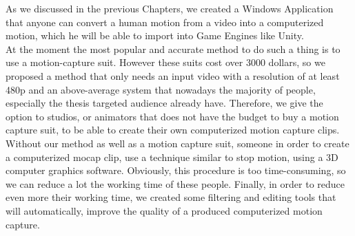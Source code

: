 As we discussed in the previous Chapters, we created a Windows Application that anyone can convert a human motion from a video into a computerized motion, which he will be able to import into Game Engines like Unity.\\ 
At the moment the most popular and accurate method to do such a thing is to use a motion-capture suit. However these suits cost over 3000 dollars, so we proposed a method that only needs an input video with a resolution of at least 480p and an above-average system that nowadays the majority of people, especially the thesis targeted audience already have. Therefore, we give the option to studios, or animators that does not have the budget to buy a motion capture suit, to be able to create their own computerized motion capture clips. Without our method as well as a motion capture suit, someone in order to create a computerized mocap clip, use a technique similar to stop motion, using a 3D computer graphics software. Obviously, this procedure is too time-consuming, so we can reduce a lot the working time of these people. Finally, in order to reduce even more their working time, we created some filtering and editing tools that will automatically, improve the quality of a produced computerized motion capture.